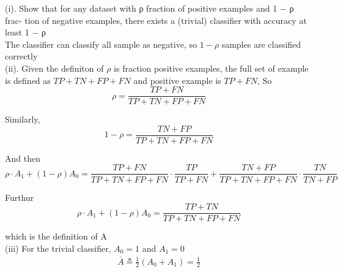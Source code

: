 \begin{answer}

(i). Show that for any dataset with ρ fraction of positive examples and 1 − ρ frac-
tion of negative examples, there exists a (trivial) classifier with accuracy at least 1 − ρ \\
The classifier can classify all sample as negative, so $1 - \rho$ samples are classified correctly \\

(ii). Given the definiton of $\rho$ is fraction positive examples, the full set of example is defined as $TP + TN + FP + FN$ and positive example is $TP + FN$, So
\begin{equation*}
    \rho = \frac{TP + FN}{TP + TN + FP + FN}
\end{equation*}

Similarly, 
\begin{equation*}
    1- \rho = \frac{TN + FP}{TP + TN + FP + FN}
\end{equation*}

And then 
\begin{equation*}
    \rho \cdot A_1 + (1-\rho)A_0 = \frac{TP + FN}{TP + TN + FP + FN} \cdot \frac{TP}{TP + FN} + \frac{TN + FP}{TP + TN + FP + FN} \cdot \frac{TN}{TN + FP}
\end{equation*}

Furthur 
\begin{equation*}
    \rho \cdot A_1 + (1-\rho)A_0 = \frac{TP + TN}{TP + TN + FP + FN}
\end{equation*}

which is the definition of A \\

(iii) For the trivial classifier, $A_0 = 1$ and $A_1 = 0$
\begin{align}
\overline{A} \triangleq \frac{1}{2} \left(A_0+A_1\right) = \frac{1}{2}
\end{align}
\end{answer}